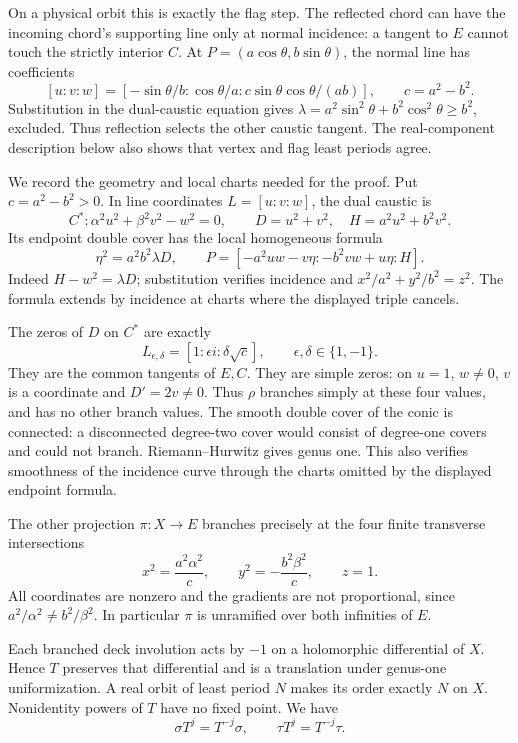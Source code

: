 \documentclass[11pt]{article}
\begin{document}
On a physical orbit this is exactly the flag step. The reflected chord can
have the incoming chord's supporting line only at normal incidence:
a tangent to \(E\) cannot touch the strictly interior \(C\).
At \(P=(a\cos\theta,b\sin\theta)\), the normal line has coefficients
\[
 [u:v:w]=[-\sin\theta/b:\cos\theta/a:
                 c\sin\theta\cos\theta/(ab)],\qquad c=a^2-b^2 .
\]
Substitution in the dual-caustic equation gives
\(\lambda=a^2\sin^2\theta+b^2\cos^2\theta\ge b^2\), excluded.
Thus reflection selects the other caustic tangent.
The real-component description below also shows that vertex and flag
least periods agree.

We record the geometry and local charts needed for the proof.
Put \(c=a^2-b^2>0\). In line coordinates \(L=[u:v:w]\), the dual caustic is
\[
 C^*:\alpha^2u^2+\beta^2v^2-w^2=0,\qquad
 D=u^2+v^2,\quad H=a^2u^2+b^2v^2.
\]
Its endpoint double cover has the local homogeneous formula
\begin{equation}\label{cover}
 \eta^2=a^2b^2\lambda D,\qquad
 P=[-a^2uw-v\eta:-b^2vw+u\eta:H].
\end{equation}
Indeed \(H-w^2=\lambda D\); substitution verifies incidence and
\(x^2/a^2+y^2/b^2=z^2\). The formula extends by incidence at charts
where the displayed triple cancels.

The zeros of \(D\) on \(C^*\) are exactly
\begin{equation}\label{branch}
 L_{\epsilon,\delta}=[1:\epsilon i:\delta\sqrt c],
 \qquad \epsilon,\delta\in\{1,-1\}.
\end{equation}
They are the common tangents of \(E,C\). They are simple zeros:
on \(u=1\), \(w\ne0\), \(v\) is a coordinate and \(D'=2v\ne0\).
Thus \(\rho\) branches simply at these four values, and has no other
branch values. The smooth double cover of the conic is connected:
a disconnected degree-two cover would consist of degree-one covers
and could not branch. Riemann--Hurwitz gives genus one.
This also verifies smoothness of the incidence curve through the
charts omitted by the displayed endpoint formula.

The other projection \(\pi:X\to E\) branches precisely at the four
finite transverse intersections
\[
 x^2=\frac{a^2\alpha^2}{c},\qquad
 y^2=-\frac{b^2\beta^2}{c},\qquad z=1.
\]
All coordinates are nonzero and the gradients are not proportional,
since \(a^2/\alpha^2\ne b^2/\beta^2\).
In particular \(\pi\) is unramified over both infinities of \(E\).

Each branched deck involution acts by \(-1\) on a holomorphic
differential of \(X\). Hence \(T\) preserves that differential and is
a translation under genus-one uniformization. A real orbit of least
period \(N\) makes its order exactly \(N\) on \(X\).
Nonidentity powers of \(T\) have no fixed point. We have
\begin{equation}\label{reverse}
 \sigma T^j=T^{-j}\sigma,\qquad \tau T^j=T^{-j}\tau .
\end{equation}
\end{document}
